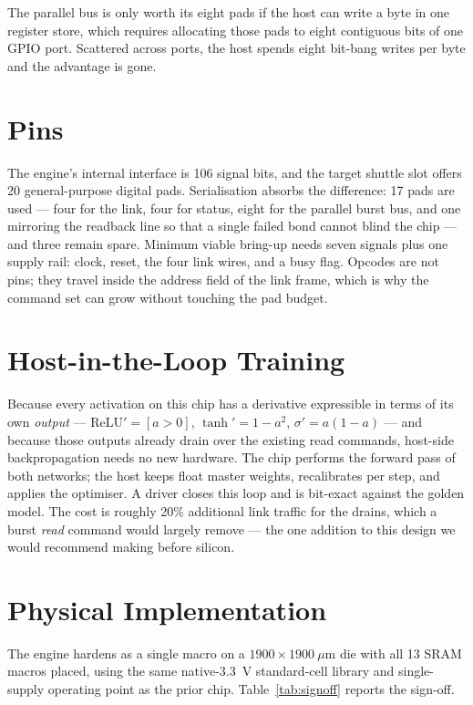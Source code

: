 \documentclass[conference,a4paper]{APSIPA2026}
\begin{document}
The parallel bus is only worth its eight pads if the host can write a byte in one register store, which requires allocating those pads to eight contiguous bits of one GPIO port. Scattered across ports, the host spends eight bit-bang writes per byte and the advantage is gone.

\section{Pins}\label{sec:pins}
The engine's internal interface is 106 signal bits, and the target shuttle slot offers 20 general-purpose digital pads. Serialisation absorbs the difference: 17 pads are used --- four for the link, four for status, eight for the parallel burst bus, and one mirroring the readback line so that a single failed bond cannot blind the chip --- and three remain spare. Minimum viable bring-up needs seven signals plus one supply rail: clock, reset, the four link wires, and a busy flag. Opcodes are not pins; they travel inside the address field of the link frame, which is why the command set can grow without touching the pad budget.

\section{Host-in-the-Loop Training}
Because every activation on this chip has a derivative expressible in terms of its own \emph{output} --- $\mathrm{ReLU}' = [a>0]$, $\tanh' = 1-a^2$, $\sigma' = a(1-a)$ --- and because those outputs already drain over the existing read commands, host-side backpropagation needs no new hardware. The chip performs the forward pass of both networks; the host keeps float master weights, recalibrates per step, and applies the optimiser. A driver closes this loop and is bit-exact against the golden model. The cost is roughly 20\% additional link traffic for the drains, which a burst \emph{read} command would largely remove --- the one addition to this design we would recommend making before silicon.

\section{Physical Implementation}\label{sec:phys}
The engine hardens as a single macro on a $1900\times1900~\mu$m die with all 13 SRAM macros placed, using the same native-3.3~V standard-cell library and single-supply operating point as the prior chip. Table~\ref{tab:signoff} reports the sign-off.
\end{document}
